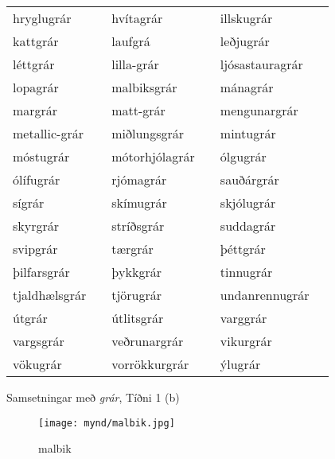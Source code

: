 \documentclass[../samsetningasafn.tex]{subfiles}
\begin{document}
\begin{wordlist}[H]
\begin{tcolorbox}
	\setlength{\extrarowheight}{3pt}
	\begin{tabular}{BlBlBl}		
		hryglugrár		&		& 
		hvítagrár		&		& 
		illskugrár		&		\\ 
		kattgrár			&		& 
		laufgrá			&		& 
		leðjugrár		&		\\ 
		léttgrár			&		& 
		lilla-grár			&		& 
		ljósastauragrár	&		\\ 
		lopagrár			&		& 
		malbiksgrár		&		& 
		mánagrár		&		\\ 
		margrár			&		& 
		matt-grár		&		& 
		mengunargrár	&		\\ 
		metallic-grár		&		& 
		miðlungsgrár	&		& 
		mintugrár		&		\\ 
		móstugrár		& 		& 
		mótorhjólagrár	&		& 
		ólgugrár			&		\\ 
		ólífugrár			&		& 
		rjómagrár		&		& 
		sauðárgrár		&		\\ 
		sígrár			&		& 
		skímugrár		&		& 
		skjólugrár		&		\\ 
		skyrgrár			&		& 
		stríðsgrár		&		& 
		suddagrár		&		\\ 
		svipgrár			&		& 
		tærgrár			&		& 
		þéttgrár			&		\\ 
		þilfarsgrár		&		& 
		þykkgrár			&		& 
		tinnugrár		&		\\ 
		tjaldhælsgrár	&		& 
		tjörugrár		&		& 
		undanrennugrár &		\\ 
		útgrár			&		& 
		útlitsgrár		&		& 
		varggrár			&		\\ 
		vargsgrár		&		& 
		veðrunargrár		&		& 
		vikurgrár		&		\\ 
		vökugrár		&		& 
		vorrökkurgrár	&		& 
		ýlugrár			&			
	\end{tabular}

\end{tcolorbox}
	\caption{Samsetningar með \textit{grár}, Tíðni 1 (b)}
	\label{listi:gratt.1b}
\end{wordlist}	

\begin{figure}[H]
\begin{tcolorbox}
\centering
	\texttt{[image: mynd/malbik.jpg]}
\end{tcolorbox}
	\caption{malbik}
	\label{mynd:malbik}
\end{figure}
\end{document}
